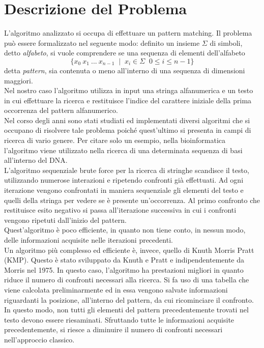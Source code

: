 \chapter{Descrizione del Problema}
L'algoritmo analizzato si occupa di effettuare un pattern matching. Il problema può essere formalizzato nel seguente modo: definito un insieme $\Sigma$ di simboli, detto {\itshape alfabeto}, si vuole comprendere se una sequenza di elementi dell'alfabeto $$\{x_0\:x_1\: ...\:x_{n-1} \;\; | \;\; x_i \in \Sigma\;\; 0\le i \le n-1\}$$ detta {\itshape pattern}, sia contenuta o meno all'interno di una sequenza di dimensioni maggiori.\\ Nel nostro caso l'algoritmo utilizza in input una stringa alfanumerica e un testo in cui effettuare la ricerca e restituisce l'indice del carattere iniziale della prima occorrenza del pattern alfanumerico.\\ 
Nel corso degli anni sono stati studiati ed implementati diversi algoritmi che si occupano di risolvere tale problema poiché quest'ultimo si presenta in campi di ricerca di vario genere. Per citare solo un esempio, nella bioinformatica l'algoritmo viene utilizzato nella ricerca di una determinata sequenza di basi all'interno del DNA.\\
L'algoritmo sequenziale brute force per la ricerca di stringhe scandisce il testo, utilizzando numerose interazioni e ripetendo confronti già effettuati. Ad ogni iterazione vengono confrontati in maniera sequenziale gli elementi del testo e quelli della stringa per vedere se è presente un'occorrenza. Al primo confronto che restituisce esito negativo si passa all'iterazione successiva in cui i confronti vengono ripetuti dall'inizio del pattern.\\ Quest'algoritmo è poco efficiente, in quanto non tiene conto, in nessun modo, delle informazioni acquisite nelle iterazioni precedenti. \\
Un algoritmo più complesso ed efficiente è, invece, quello di Knuth Morris Pratt (KMP). Questo è stato sviluppato da Knuth e Pratt e indipendentemente da Morris nel 1975. In questo caso, l'algoritmo ha prestazioni migliori in quanto riduce il numero di confronti necessari alla ricerca. Si fa uso di una tabella che viene calcolata preliminarmente ed in essa vengono salvate informazioni riguardanti la posizione, all'interno del pattern, da cui ricominciare il confronto. \\
In questo modo, non tutti gli elementi del pattern precedentemente trovati nel testo devono essere riesaminati. Sfruttando tutte le informazioni acquisite precedentemente, si riesce a diminuire il numero di confronti necessari nell'approccio classico.\\
